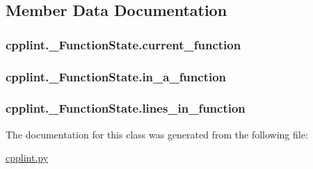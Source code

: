 \subsection{Member Data Documentation}
\subsubsection[{\texorpdfstring{current\+\_\+function}{current_function}}]{\setlength{\rightskip}{0pt plus 5cm}cpplint.\+\_\+\+Function\+State.\+current\+\_\+function}\hypertarget{classcpplint_1_1__FunctionState_a320674f54bd75087febc8f0d83620569}{}\label{classcpplint_1_1__FunctionState_a320674f54bd75087febc8f0d83620569}
\subsubsection[{\texorpdfstring{in\+\_\+a\+\_\+function}{in_a_function}}]{\setlength{\rightskip}{0pt plus 5cm}cpplint.\+\_\+\+Function\+State.\+in\+\_\+a\+\_\+function}\hypertarget{classcpplint_1_1__FunctionState_a8362d472591f60462184bf68b49c0efb}{}\label{classcpplint_1_1__FunctionState_a8362d472591f60462184bf68b49c0efb}
\subsubsection[{\texorpdfstring{lines\+\_\+in\+\_\+function}{lines_in_function}}]{\setlength{\rightskip}{0pt plus 5cm}cpplint.\+\_\+\+Function\+State.\+lines\+\_\+in\+\_\+function}\hypertarget{classcpplint_1_1__FunctionState_a886f5d476adc81f499a711750a399aa2}{}\label{classcpplint_1_1__FunctionState_a886f5d476adc81f499a711750a399aa2}


The documentation for this class was generated from the following file\+:\begin{DoxyCompactItemize}
\item 
\hyperlink{cpplint_8py}{cpplint.\+py}\end{DoxyCompactItemize}
